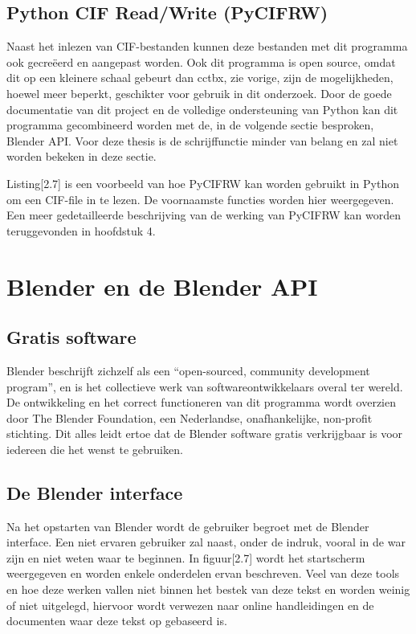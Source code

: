 \subsection{Python CIF Read/Write (PyCIFRW)}
Naast het inlezen van CIF-bestanden kunnen deze bestanden met dit programma ook gecreëerd en aangepast worden. Ook dit programma is open source, omdat dit op een kleinere schaal gebeurt dan cctbx, zie vorige, zijn de mogelijkheden, hoewel meer beperkt, geschikter voor gebruik in dit onderzoek. Door de goede documentatie van dit project en de volledige ondersteuning van Python kan dit programma gecombineerd worden met de, in de volgende sectie besproken, Blender API. \citep*{PYCIFRW1} Voor deze thesis is de schrijffunctie minder van belang en zal niet worden bekeken in deze sectie. 

\lstset{caption = Werken met PyCIFRW in Python3}


\par 
Listing[2.7] is een voorbeeld van hoe PyCIFRW kan worden gebruikt in Python om een CIF-file in te lezen. De voornaamste functies worden hier weergegeven. Een meer gedetailleerde beschrijving van de werking van PyCIFRW kan worden teruggevonden in hoofdstuk 4.

\section{Blender en de Blender API}

\subsection{Gratis software}
Blender beschrijft zichzelf als een \enquote{open-sourced, community development program}, en is het collectieve werk van softwareontwikkelaars overal ter wereld. \citep*{BLEN1} De ontwikkeling en het correct functioneren van dit programma wordt overzien door The Blender Foundation, een Nederlandse, onafhankelijke, non-profit stichting. Dit alles leidt ertoe dat de Blender software gratis verkrijgbaar is voor iedereen die het wenst te gebruiken.

\subsection{De Blender interface}
Na het opstarten van Blender wordt de gebruiker begroet met de Blender interface. Een niet ervaren gebruiker zal naast, onder de indruk, vooral in de war zijn en niet weten waar te beginnen. In figuur[2.7] wordt het startscherm weergegeven en worden enkele onderdelen ervan beschreven. Veel van deze tools en hoe deze werken vallen niet binnen het bestek van deze tekst en worden weinig of niet uitgelegd, hiervoor wordt verwezen naar online handleidingen en de documenten waar deze tekst op gebaseerd is. 

